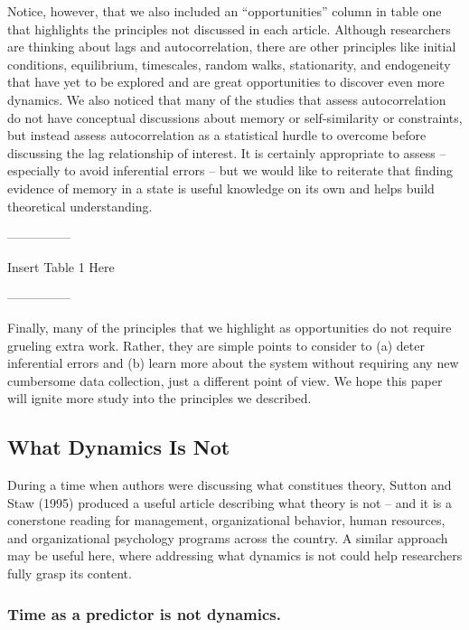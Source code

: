 \documentclass[english,,man]{apa6}
\theoremstyle{definition}
\theoremstyle{definition}
\theoremstyle{definition}
\theoremstyle{remark}
\begin{document}
Notice, however, that we also included an \enquote{opportunities} column
in table one that highlights the principles not discussed in each
article. Although researchers are thinking about lags and
autocorrelation, there are other principles like initial conditions,
equilibrium, timescales, random walks, stationarity, and endogeneity
that have yet to be explored and are great opportunities to discover
even more dynamics. We also noticed that many of the studies that assess
autocorrelation do not have conceptual discussions about memory or
self-similarity or constraints, but instead assess autocorrelation as a
statistical hurdle to overcome before discussing the lag relationship of
interest. It is certainly appropriate to assess -- especially to avoid
inferential errors -- but we would like to reiterate that finding
evidence of memory in a state is useful knowledge on its own and helps
build theoretical understanding.

\begin{center}

---------------

Insert Table 1 Here

---------------

\end{center}

Finally, many of the principles that we highlight as opportunities do
not require grueling extra work. Rather, they are simple points to
consider to (a) deter inferential errors and (b) learn more about the
system without requiring any new cumbersome data collection, just a
different point of view. We hope this paper will ignite more study into
the principles we described.

\hypertarget{what-dynamics-is-not}{%
\subsection{What Dynamics Is Not}\label{what-dynamics-is-not}}

During a time when authors were discussing what constitues theory,
Sutton and Staw (1995) produced a useful article describing what theory
is not -- and it is a conerstone reading for management, organizational
behavior, human resources, and organizational psychology programs across
the country. A similar approach may be useful here, where addressing
what dynamics is not could help researchers fully grasp its content.

\hypertarget{time-as-a-predictor-is-not-dynamics.}{%
\subsubsection{Time as a predictor is not
dynamics.}\label{time-as-a-predictor-is-not-dynamics.}}
\end{document}
